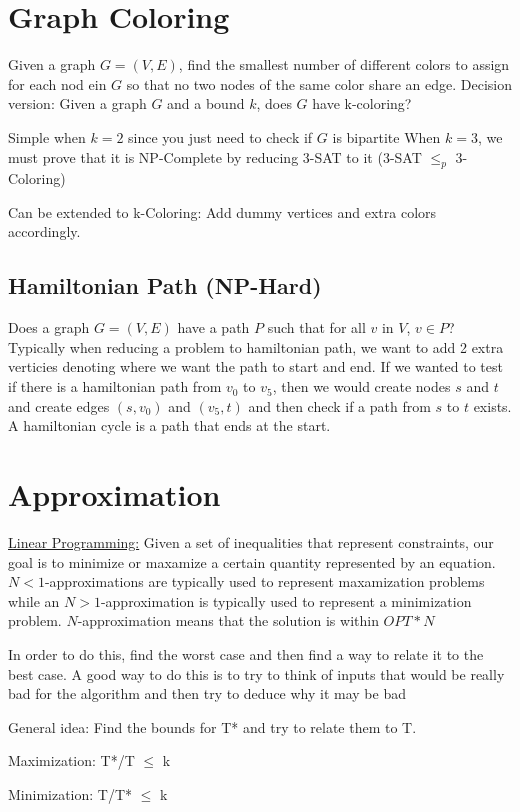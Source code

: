 \documentclass{article}
\begin{document}
\section{Graph Coloring}
Given a graph $G = (V, E)$, find the smallest number of different colors to assign for 
each nod ein $G$ so that no two nodes of the same color share an edge. Decision version: 
Given a graph $G$ and a bound $k$, does $G$ have k-coloring?

Simple when $k=2$ since you just need to check if $G$ is bipartite
When $k=3$, we must prove that it is NP-Complete by reducing 3-SAT to it (3-SAT $\leq_p$ 3-Coloring)

Can be extended to k-Coloring: Add dummy vertices and extra colors accordingly.
\subsection{Hamiltonian Path (NP-Hard)}
Does a graph $G = (V, E)$ have a path $P$ such that for all $v$ in $V$, $v \in P$?
Typically when reducing a problem to hamiltonian path, we want to add 2 extra verticies denoting
where we want the path to start and end. If we wanted to test if there is a hamiltonian path from 
$v_0$ to $v_5$, then we would create nodes $s$ and $t$ and create edges $(s, v_0)$ and $(v_5, t)$
and then check if a path from $s$ to $t$ exists. A hamiltonian cycle is a path that ends at the
start.

\section{Approximation}
\underline{Linear Programming:} Given a set of inequalities that represent constraints, our
goal is to minimize or maxamize a certain quantity represented 
by an equation.
$N<1$-approximations are typically used to represent maxamization problems while
an $N>1$-approximation is typically used to represent a minimization problem. 
$N$-approximation means that the solution is within $OPT*N$

In order to do this, find the worst case and then find a way to relate it to the best case.
A good way to do this is to try to think of inputs that would be really bad for the algorithm
and then try to deduce why it may be bad

General idea: Find the bounds for T* and try to relate them to T.

Maximization: T*/T $\leq$ k

Minimization: T/T* $\leq$ k
\end{document}
